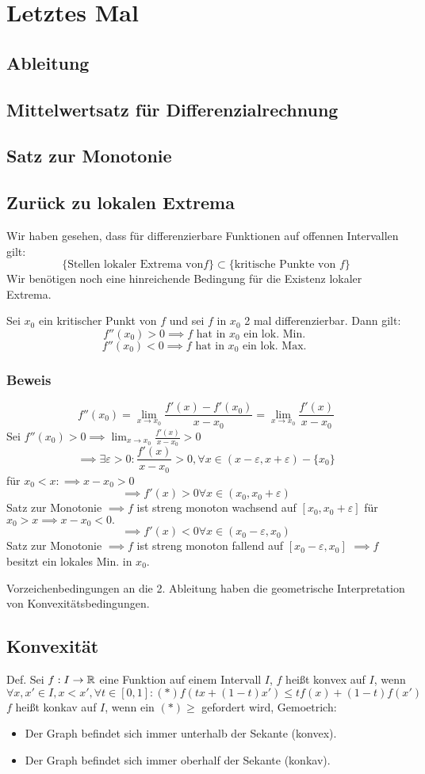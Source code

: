 \documentclass[a4paper]{article}
\author{Yousef Khell}
\date{09.12.2022}
\begin{document}
\section{Letztes Mal}
\subsection*{Ableitung}
\subsection*{Mittelwertsatz für Differenzialrechnung}
\subsection*{Satz zur Monotonie}
\subsection*{Zurück zu lokalen Extrema}
Wir haben gesehen, dass für differenzierbare Funktionen auf offennen Intervallen gilt:
$$ \{\text{Stellen lokaler Extrema von} f\} \subset \{\text{kritische Punkte von }f\} $$
Wir benötigen noch eine hinreichende Bedingung für die Existenz lokaler Extrema.

Sei $x_0$ ein kritischer Punkt von $f$ und sei $f$ in $x_0$ 2 mal differenzierbar. Dann gilt:
$$ f''(x_0) > 0 \implies f \text{ hat in } x_0 \text{ ein lok. Min. }$$
$$ f''(x_0) < 0 \implies f \text{ hat in } x_0 \text{ ein lok. Max. }$$
\subsubsection{Beweis}
$$f''(x_0) = \lim_{x \to x_0} \frac{f'(x) - f'(x_0)}{x-x_0} = \lim_{x \to x_0} \frac{f'(x)}{x-x_0}$$
Sei $f''(x_0) > 0 \implies \lim_{x \to x_0} \frac{f'(x)}{x-x_0} > 0$
$$\implies \exists \varepsilon > 0 : \frac{f'(x)}{x-x_0} > 0, \forall x \in (x-\varepsilon, x+\varepsilon) - \{x_0\} $$
für $x_0 < x: \implies x - x_0 > 0$
$$\implies f'(x) > 0 \forall x \in (x_0, x_0 + \varepsilon)$$
Satz zur Monotonie $\implies f $ ist streng monoton wachsend auf $[x_0, x_0 + \varepsilon]$
für $x_0 > x \implies x - x_0 < 0.$
$$ \implies f'(x) < 0 \forall x \in (x_0 - \varepsilon, x_0) $$
Satz zur Monotonie $\implies f$ ist streng monoton fallend auf $[x_0 - \varepsilon, x_0]$
$\implies f$ besitzt ein lokales Min. in $x_0$.

Vorzeichenbedingungen an die 2. Ableitung haben die geometrische Interpretation von Konvexitätsbedingungen.
\subsection*{Konvexität}
Def. Sei $f: I \to \Bbb R$ eine Funktion auf einem Intervall $I$,
$f$ heißt konvex auf $I$, wenn
$$\forall x, x' \in I, x < x', \forall t \in [0, 1]: (*) f(tx + (1-t)x') \leq tf(x) + (1-t)f(x')$$
$f$ heißt konkav auf $I$, wenn ein $(*) \geq$  gefordert wird,
Gemoetrich:
\begin{itemize}
\item Der Graph befindet sich immer unterhalb der Sekante (konvex).
\item Der Graph befindet sich immer oberhalf der Sekante (konkav).
\end{itemize}
\end{document}
